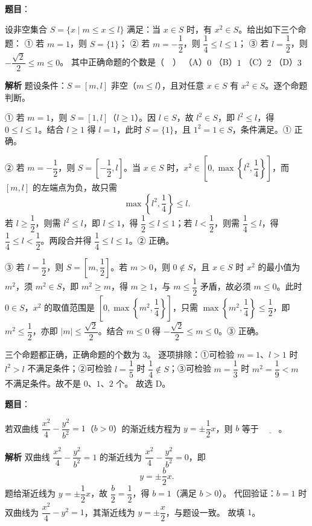 \begin{answer}

\textbf{题目}：

设非空集合 $S=\{x\mid m\leqslant x\leqslant l\}$ 满足：当 $x\in S$ 时，有 $x^2\in S$。给出如下三个命题：
① 若 $m=1$，则 $S=\{1\}$；
② 若 $m=-\dfrac12$，则 $\dfrac14\leqslant l\leqslant1$；
③ 若 $l=\dfrac12$，则 $-\dfrac{\sqrt2}{2}\leqslant m\leqslant0$。
其中正确命题的个数是（　）
（A）$0$
（B）$1$
（C）$2$
（D）$3$

\textbf{解析}
题设条件：$S=[m,l]$ 非空（$m\leqslant l$），且对任意 $x\in S$ 有 $x^2\in S$。逐个命题判断。

① 若 $m=1$，则 $S=[1,l]$（$l\geqslant1$）。因 $l\in S$，故 $l^2\in S$，即 $l^2\leqslant l$，得 $0\leqslant l\leqslant1$。结合 $l\geqslant1$ 得 $l=1$，此时 $S=\{1\}$，且 $1^2=1\in S$，条件满足。① 正确。

② 若 $m=-\dfrac12$，则 $S=\left[-\dfrac12,l\right]$。当 $x\in S$ 时，$x^2\in\left[0,\max\left\{l^2,\dfrac14\right\}\right]$，而 $[m,l]$ 的左端点为负，故只需
\nopagebreak[4]
\[\max\left\{l^2,\frac14\right\}\leqslant l.\]
若 $l\geqslant\dfrac12$，则需 $l^2\leqslant l$，即 $l\leqslant1$，得 $\dfrac12\leqslant l\leqslant1$；若 $l<\dfrac12$，则需 $\dfrac14\leqslant l$，得 $\dfrac14\leqslant l<\dfrac12$。两段合并得 $\dfrac14\leqslant l\leqslant1$。② 正确。

③ 若 $l=\dfrac12$，则 $S=\left[m,\dfrac12\right]$。若 $m>0$，则 $0\notin S$，且 $x\in S$ 时 $x^2$ 的最小值为 $m^2$，须 $m^2\in S$，即 $m^2\geqslant m$，得 $m\geqslant1$，与 $m\leqslant\dfrac12$ 矛盾，故必须 $m\leqslant0$。此时 $0\in S$，$x^2$ 的取值范围是 $\left[0,\max\left\{m^2,\dfrac14\right\}\right]$，只需 $\max\left\{m^2,\dfrac14\right\}\leqslant\dfrac12$，即 $m^2\leqslant\dfrac12$，亦即 $|m|\leqslant\dfrac{\sqrt2}{2}$。结合 $m\leqslant0$ 得 $-\dfrac{\sqrt2}{2}\leqslant m\leqslant0$。③ 正确。

三个命题都正确，正确命题的个数为 $3$。
逐项排除：①可检验 $m=1$、$l>1$ 时 $l^2>l$ 不满足条件；②可检验 $l=\dfrac15$ 时 $\dfrac14\notin S$；③可检验 $m=\dfrac13$ 时 $m^2=\dfrac19< m$ 不满足条件。故不是 $0$、$1$、$2$ 个。
故选 D。


\end{answer}
\begin{answer}

\textbf{题目}：

若双曲线 $\dfrac{x^2}{4}-\dfrac{y^2}{b^2}=1$（$b>0$）的渐近线方程为 $y=\pm\dfrac12x$，则 $b$ 等于 $\underline{\qquad}$。

\textbf{解析}
双曲线 $\dfrac{x^2}{4}-\dfrac{y^2}{b^2}=1$ 的渐近线为 $\dfrac{x^2}{4}-\dfrac{y^2}{b^2}=0$，即
\nopagebreak[4]
\[y=\pm\frac{b}{2}x.\]
题给渐近线为 $y=\pm\dfrac12x$，故 $\dfrac b2=\dfrac12$，得 $b=1$（满足 $b>0$）。
代回验证：$b=1$ 时双曲线为 $\dfrac{x^2}{4}-y^2=1$，其渐近线为 $y=\pm\dfrac x2$，与题设一致。
故填 $1$。


\end{answer}
